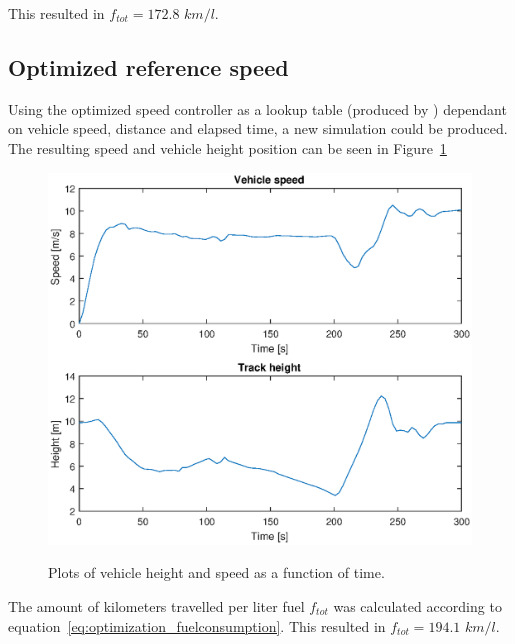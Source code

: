 This resulted in $f_{tot} = 172.8$ $km/l$. %

\subsection{Optimized reference speed}
Using the optimized speed controller as a lookup table (produced by
\citep{liu2016}) dependant on vehicle speed, distance and elapsed time, a new
simulation could be produced. The resulting speed and vehicle height position
can be seen in Figure~\ref{fig:optimization_optimal_speed}

\begin{figure}[H]
    \centering\label{fig:optimization_optimal_speed}
    \includegraphics[width=\textwidth]{./img/optimization_optimal_speed.eps}
    \caption{Plots of vehicle height and speed as a function of time.}
\end{figure}

The amount of kilometers travelled per liter fuel $f_{tot}$ was calculated
according to equation~\ref{eq:optimization_fuelconsumption}. This resulted in
$f_{tot} = 194.1$ $km/l$. %
